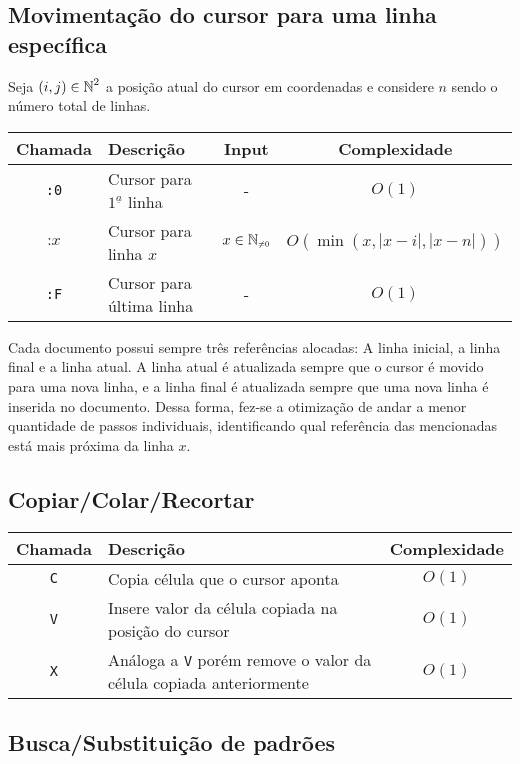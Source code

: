 \documentclass[a4paper, 11pt]{article}
\begin{document}
\subsection{Movimentação do cursor para uma linha específica}

Seja $(i, j) \in \operatorname{\mathbb{N}}^2$ a posição atual do cursor em coordenadas e considere $n$ sendo o número total de linhas.
\begin{table}[H]
\centering
\begin{tabularx}{\linewidth}{|c|X|c|c|}
\hline
\textbf{Chamada} & \textbf{Descrição} & \textbf{Input} & \textbf{Complexidade} \\ 
\hline
\texttt{:0} & Cursor para $1^{\underline{a}}$ linha & - & $O(1)$ \\
$\texttt{:}x$ & Cursor para linha $x$ & $x\in \sub{\N}{\neq 0}$ & $O(\min(x, |x-i|, |x-n|))$ \\
\texttt{:F} & Cursor para última linha  & - & $O(1)$ \\
\hline
\end{tabularx}
\end{table}

Cada documento possui sempre três referências alocadas: A linha inicial, a linha final e a linha atual. A linha atual é atualizada sempre que o cursor é movido para uma nova linha, e a linha final é atualizada sempre que uma nova linha é inserida no documento. Dessa forma, fez-se a otimização de andar a menor quantidade de passos individuais, identificando qual referência das mencionadas está mais próxima da linha $x$. 

\subsection{Copiar/Colar/Recortar}
\begin{table}[H]
\centering
\begin{tabularx}{\linewidth}{|c|X|c|}
\hline
\textbf{Chamada} & \textbf{Descrição} & \textbf{Complexidade}
\\ 
\hline
\texttt{C} & Copia célula que o cursor aponta & $O(1)$ \\
\texttt{V} & Insere valor da célula copiada na posição do cursor & $O(1)$ \\
\texttt{X} & Análoga a \texttt{V} porém remove o valor da célula copiada anteriormente & $O(1)$ \\
\hline
\end{tabularx}
\end{table}


\subsection{Busca/Substituição de padrões}
\end{document}
